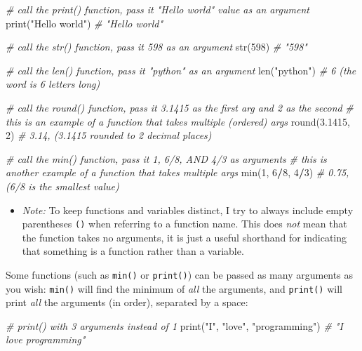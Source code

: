 \documentclass[]{book}
\newenvironment{Shaded}{\begin{snugshade}}{\end{snugshade}}
\newcommand{\DecValTok}[1]{\textcolor[rgb]{0.00,0.00,0.81}{#1}}
\newcommand{\FloatTok}[1]{\textcolor[rgb]{0.00,0.00,0.81}{#1}}
\newcommand{\StringTok}[1]{\textcolor[rgb]{0.31,0.60,0.02}{#1}}
\newcommand{\CommentTok}[1]{\textcolor[rgb]{0.56,0.35,0.01}{\textit{#1}}}
\newcommand{\OperatorTok}[1]{\textcolor[rgb]{0.81,0.36,0.00}{\textbf{#1}}}
\newcommand{\BuiltInTok}[1]{#1}
\newcommand{\NormalTok}[1]{#1}
\providecommand{\tightlist}{%
  \setlength{\itemsep}{0pt}\setlength{\parskip}{0pt}}
\begin{document}
\begin{Shaded}
\begin{Highlighting}[]
\CommentTok{# call the print() function, pass it "Hello world" value as an argument}
\BuiltInTok{print}\NormalTok{(}\StringTok{"Hello world"}\NormalTok{)  }\CommentTok{# "Hello world"}

\CommentTok{# call the str() function, pass it 598 as an argument}
\BuiltInTok{str}\NormalTok{(}\DecValTok{598}\NormalTok{)  }\CommentTok{# "598"}

\CommentTok{# call the len() function, pass it "python" as an argument}
\BuiltInTok{len}\NormalTok{(}\StringTok{"python"}\NormalTok{)  }\CommentTok{# 6 (the word is 6 letters long)}

\CommentTok{# call the round() function, pass it 3.1415 as the first arg and 2 as the second}
\CommentTok{# this is an example of a function that takes multiple (ordered) args}
\BuiltInTok{round}\NormalTok{(}\FloatTok{3.1415}\NormalTok{, }\DecValTok{2}\NormalTok{)  }\CommentTok{# 3.14, (3.1415 rounded to 2 decimal places)}

\CommentTok{# call the min() function, pass it 1, 6/8, AND 4/3 as arguments}
\CommentTok{# this is another example of a function that takes multiple args}
\BuiltInTok{min}\NormalTok{(}\DecValTok{1}\NormalTok{, }\DecValTok{6}\OperatorTok{/}\DecValTok{8}\NormalTok{, }\DecValTok{4}\OperatorTok{/}\DecValTok{3}\NormalTok{)  }\CommentTok{# 0.75, (6/8 is the smallest value)}
\end{Highlighting}
\end{Shaded}

\begin{itemize}
\tightlist
\item
  \emph{Note:} To keep functions and variables distinct, I try to always
  include empty parentheses \texttt{()} when referring to a function
  name. This does \emph{not} mean that the function takes no arguments,
  it is just a useful shorthand for indicating that something is a
  function rather than a variable.
\end{itemize}

Some functions (such as \texttt{min()} or \texttt{print()}) can be
passed as many arguments as you wish: \texttt{min()} will find the
minimum of \emph{all} the arguments, and \texttt{print()} will print
\emph{all} the arguments (in order), separated by a space:

\begin{Shaded}
\begin{Highlighting}[]
\CommentTok{# print() with 3 arguments instead of 1}
\BuiltInTok{print}\NormalTok{(}\StringTok{"I"}\NormalTok{, }\StringTok{"love"}\NormalTok{, }\StringTok{"programming"}\NormalTok{)  }\CommentTok{# "I love programming"}
\end{Highlighting}
\end{Shaded}
\end{document}
